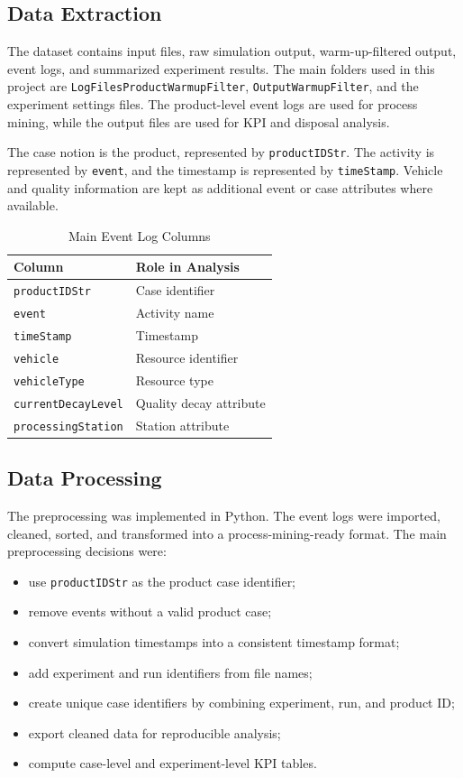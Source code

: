 \documentclass[conference]{IEEEtran}
\begin{document}
\subsection{Data Extraction}

The dataset contains input files, raw simulation output, warm-up-filtered output, event logs, and summarized experiment results. The main folders used in this project are \texttt{LogFilesProductWarmupFilter}, \texttt{OutputWarmupFilter}, and the experiment settings files. The product-level event logs are used for process mining, while the output files are used for KPI and disposal analysis.

The case notion is the product, represented by \texttt{productIDStr}. The activity is represented by \texttt{event}, and the timestamp is represented by \texttt{timeStamp}. Vehicle and quality information are kept as additional event or case attributes where available.

\begin{table}[t]
\caption{Main Event Log Columns}
\label{tab:event-schema}
\centering
\begin{tabular}{|l|l|}
\hline
\textbf{Column} & \textbf{Role in Analysis} \\
\hline
\texttt{productIDStr} & Case identifier \\
\hline
\texttt{event} & Activity name \\
\hline
\texttt{timeStamp} & Timestamp \\
\hline
\texttt{vehicle} & Resource identifier \\
\hline
\texttt{vehicleType} & Resource type \\
\hline
\texttt{currentDecayLevel} & Quality decay attribute \\
\hline
\texttt{processingStation} & Station attribute \\
\hline
\end{tabular}
\end{table}

\subsection{Data Processing}

The preprocessing was implemented in Python. The event logs were imported, cleaned, sorted, and transformed into a process-mining-ready format. The main preprocessing decisions were:

\begin{itemize}
\item use \texttt{productIDStr} as the product case identifier;
\item remove events without a valid product case;
\item convert simulation timestamps into a consistent timestamp format;
\item add experiment and run identifiers from file names;
\item create unique case identifiers by combining experiment, run, and product ID;
\item export cleaned data for reproducible analysis;
\item compute case-level and experiment-level KPI tables.
\end{itemize}
\end{document}
